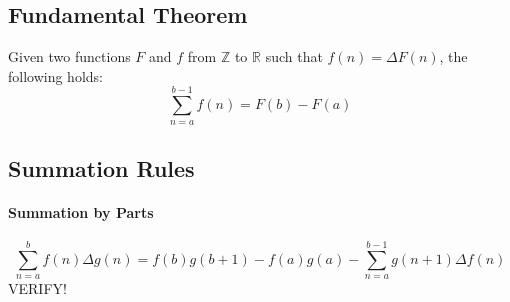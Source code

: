 


\subsection{Fundamental Theorem}
Given two functions $F$ and $f$ from $\mathbb{Z}$ to $\mathbb{R}$ such that $f(n) = \Delta F(n)$, the following holds:
\begin{equation}
 \sum_{n=a}^{b-1} f(n) = F(b) - F(a)
\end{equation}








\subsection{Summation Rules}

\paragraph{Summation by Parts}

\begin{equation}
\sum_{n=a}^{b} f(n) \Delta g(n) 
=
f(b) g(b+1) - f(a) g(a) - \sum_{n=a}^{b-1} g(n+1) \Delta f(n)
\end{equation}
VERIFY!








